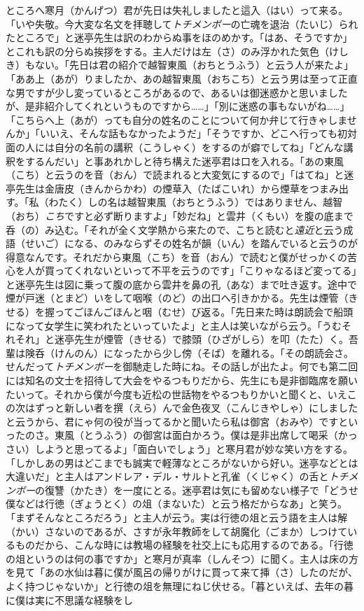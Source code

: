 \documentclass{book}
\begin{document}
ところへ寒月（かんげつ）君が先日は失礼しましたと這入（はい）って来る。「いや失敬。今大変な名文を拝聴して\emph{トチメンボー}の亡魂を退治（たいじ）られたところで」と迷亭先生は訳のわからぬ事をほのめかす。「はあ、そうですか」とこれも訳の分らぬ挨拶をする。主人だけは左（さ）のみ浮かれた気色（けしき）もない。「先日は君の紹介で越智東風（おちとうふう）と云う人が来たよ」「ああ上（あが）りましたか、あの越智東風（おちこち）と云う男は至って正直な男ですが少し変っているところがあるので、あるいは御迷惑かと思いましたが、是非紹介してくれというものですから\ldots{}\ldots{}」「別に迷惑の事もないがね\ldots{}\ldots{}」「こちらへ上（あが）っても自分の姓名のことについて何か弁じて行きゃしませんか」「いいえ、そんな話もなかったようだ」「そうですか、どこへ行っても初対面の人には自分の名前の講釈（こうしゃく）をするのが癖でしてね」「どんな講釈をするんだい」と事あれかしと待ち構えた迷亭君は口を入れる。「あの東風（こち）と云うのを音（おん）で読まれると大変気にするので」「はてね」と迷亭先生は金唐皮（きんからかわ）の煙草入（たばこいれ）から煙草をつまみ出す。「私（わたく）しの名は越智東風（おちとうふう）ではありません、越智（おち）\emph{こち}ですと必ず断りますよ」「妙だね」と雲井（くもい）を腹の底まで呑（の）み込む。「それが全く文学熱から来たので、こちと読むと\emph{遠近}と云う成語（せいご）になる、のみならずその姓名が韻（いん）を踏んでいると云うのが得意なんです。それだから東風（こち）を音（おん）で読むと僕がせっかくの苦心を人が買ってくれないといって不平を云うのです」「こりゃなるほど変ってる」と迷亭先生は図に乗って腹の底から雲井を鼻の孔（あな）まで吐き返す。途中で煙が戸迷（とまど）いをして咽喉（のど）の出口へ引きかかる。先生は煙管（きせる）を握ってごほんごほんと咽（むせ）び返る。「先日来た時は朗読会で船頭になって女学生に笑われたといっていたよ」と主人は笑いながら云う。「うむそれそれ」と迷亭先生が煙管（きせる）で膝頭（ひざがしら）を叩（たた）く。吾輩は険呑（けんのん）になったから少し傍（そば）を離れる。「その朗読会さ。せんだって\emph{トチメンボー}を御馳走した時にね。その話しが出たよ。何でも第二回には知名の文士を招待して大会をやるつもりだから、先生にも是非御臨席を願いたいって。それから僕が今度も近松の世話物をやるつもりかいと聞くと、いえこの次はずっと新しい者を撰（えら）んで金色夜叉（こんじきやしゃ）にしましたと云うから、君にゃ何の役が当ってるかと聞いたら私は御宮（おみや）ですといったのさ。東風（とうふう）の御宮は面白かろう。僕は是非出席して喝采（かっさい）しようと思ってるよ」「面白いでしょう」と寒月君が妙な笑い方をする。「しかしあの男はどこまでも誠実で軽薄なところがないから好い。迷亭などとは大違いだ」と主人はアンドレア・デル・サルトと孔雀（くじゃく）の舌と\emph{トチメンボー}の復讐（かたき）を一度にとる。迷亭君は気にも留めない様子で「どうせ僕などは行徳（ぎょうとく）の俎（まないた）と云う格だからなあ」と笑う。「まずそんなところだろう」と主人が云う。実は行徳の俎と云う語を主人は解（かい）さないのであるが、さすが永年教師をして胡魔化（ごまか）しつけているものだから、こんな時には教場の経験を社交上にも応用するのである。「行徳の俎というのは何の事ですか」と寒月が真率（しんそつ）に聞く。主人は床の方を見て「あの水仙は暮に僕が風呂の帰りがけに買って来て挿（さ）したのだが、よく持つじゃないか」と行徳の俎を無理にねじ伏せる。「暮といえば、去年の暮に僕は実に不思議な経験をし
\end{document}
